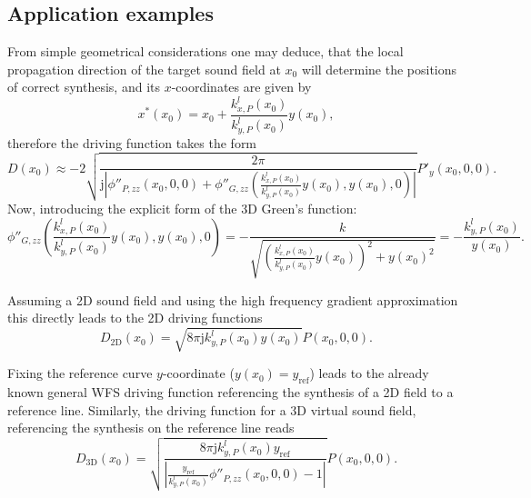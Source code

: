 \documentclass[12pt,a4paper]{article}
\newcommand{\ti}{\mathrm{j}}
\newcommand{\yref}{y_{\mathrm{ref}}}
\begin{document}
\subsection{Application examples}
From simple geometrical considerations one may deduce, that the local propagation direction of the target sound field at $x_0$ will determine the positions of correct synthesis, and its $x$-coordinates are given by
\begin{equation}
x^*(x_0) = x_0 + \frac{k^l_{x,P}(x_0)}{k^l_{y,P}(x_0)} y(x_0), 
\end{equation}
therefore the driving function takes the form
\begin{equation}
D(x_0) \approx -2
\sqrt{ \frac{2\pi}{\ti \left| \phi''_{P,zz}(x_0,0,0	) + \phi''_{G,zz}(\frac{k^l_{x,P}(x_0)}{k^l_{y,P}(x_0)} y(x_0),y(x_0),0) \right|}}
 P'_y(x_0,0,0).
\end{equation}
Now, introducing the explicit form of the 3D Green's function:
\begin{equation}
\phi''_{G,zz}(\frac{k^l_{x,P}(x_0)}{k^l_{y,P}(x_0)} y(x_0),y(x_0),0) = -\frac{k}{\sqrt{\left( \frac{k^l_{x,P}(x_0)}{k^l_{y,P}(x_0)} y(x_0) \right)^2 + y(x_0)^2}}
= 
-\frac{k^l_{y,P}(x_0)}{y(x_0)}.
\end{equation}

Assuming a 2D sound field and using the high frequency gradient approximation this directly leads to the 2D driving functions
\begin{equation}
D_{2\mathrm{D}}(x_0) = 
\sqrt{ 8\pi \ti k^l_{y,P}(x_0) y(x_0) }
 P(x_0,0,0).
\end{equation}

Fixing the reference curve $y$-coordinate ($y(x_0) = \yref$) leads to the already known general WFS driving function referencing the synthesis of a 2D field to a reference line. Similarly, the driving function for a 3D virtual sound field, referencing the synthesis on the reference line reads
\begin{equation}
D_{3\mathrm{D}}(x_0) = 
\sqrt{ \frac{8\pi \ti k^l_{y,P}(x_0) \yref }{\left| \frac{\yref}{k^l_{y,P}(x_0)}\phi''_{P,zz}(x_0,0,0	) - 1 \right|}} P(x_0,0,0).
\end{equation}
\end{document}
